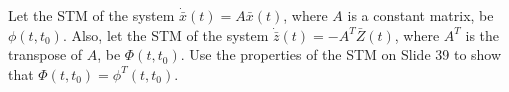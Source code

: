 \item Let the STM of the system $\dot {\bar x}(t) = A\bar x(t)$, where $A$ is a constant matrix, be
  $\phi (t, t_0)$. Also, let the STM of the system $\dot {\bar z}(t) = -A^T\bar Z(t)$, where $A^T$ is the
  transpose of $A$, be $\Phi(t, t_0)$. Use the properties of the STM on Slide 39 to show that
  $\Phi(t, t_0) = \phi^T(t, t_0)$.